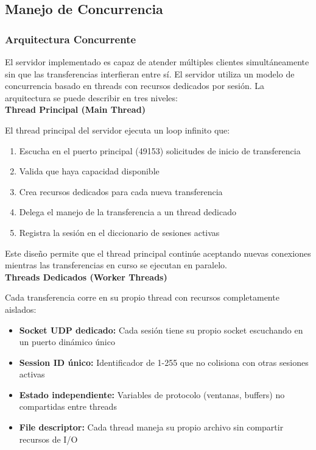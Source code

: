 \subsection{Manejo de Concurrencia}

\subsubsection{Arquitectura Concurrente}
El servidor implementado es capaz de atender múltiples clientes simultáneamente sin que las transferencias interfieran entre sí.
El servidor utiliza un modelo de concurrencia basado en threads con recursos dedicados por sesión. La arquitectura se puede describir en tres niveles:
\\

\textbf{Thread Principal (Main Thread)}

El thread principal del servidor ejecuta un loop infinito que:

\begin{enumerate}
    \item Escucha en el puerto principal (49153) solicitudes de inicio de transferencia
    \item Valida que haya capacidad disponible
    \item Crea recursos dedicados para cada nueva transferencia
    \item Delega el manejo de la transferencia a un thread dedicado
    \item Registra la sesión en el diccionario de sesiones activas
\end{enumerate}

Este diseño permite que el thread principal continúe aceptando nuevas conexiones mientras las transferencias en curso se ejecutan en paralelo.
\\

\textbf{Threads Dedicados (Worker Threads)}

Cada transferencia corre en su propio thread con recursos completamente aislados:

\begin{itemize}
    \item \textbf{Socket UDP dedicado:} Cada sesión tiene su propio socket escuchando en un puerto dinámico único
    \item \textbf{Session ID único:} Identificador de 1-255 que no colisiona con otras sesiones activas
    \item \textbf{Estado independiente:} Variables de protocolo (ventanas, buffers) no compartidas entre threads
    \item \textbf{File descriptor:} Cada thread maneja su propio archivo sin compartir recursos de I/O
\end{itemize}

